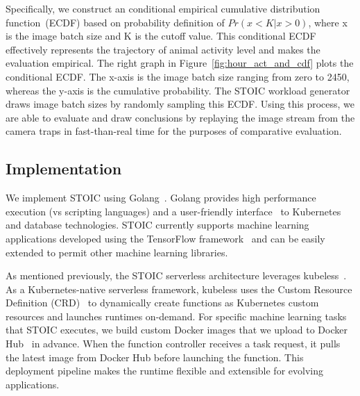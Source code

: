Specifically, we construct an
conditional empirical cumulative distribution function~(ECDF) based on
probability definition of  $Pr(x < K | x > 0)$, where x is the image batch
size and K is the cutoff value. This conditional ECDF effectively represents
the trajectory of animal activity level and makes the evaluation empirical.
The right graph in Figure~\ref{fig:hour_act_and_cdf} plots the conditional ECDF. 
The x-axis is the image
batch size ranging from zero to 2450, whereas the y-axis is the cumulative
probability. The STOIC workload generator draws image batch sizes by
randomly sampling this ECDF.
Using this process,
we are able to evaluate and draw conclusions by replaying the image stream
from the camera traps in fast-than-real time for the purposes of comparative
evaluation.




 \subsection{Implementation}

We implement STOIC using
Golang~\cite{ref:golang}. Golang provides high performance execution (vs
scripting languages) and a user-friendly interface~\cite{ref:client-go} to
Kubernetes and database technologies. STOIC currently supports machine learning
applications developed using the TensorFlow framework~\cite{ref:tensorflow}
and can be easily extended to permit other machine learning libraries.
 
As mentioned previously, 
the STOIC serverless architecture leverages kubeless~\cite{ref:kubeless}.
As a Kubernetes-native
serverless framework, kubeless uses the Custom Resource Definition
(CRD)~\cite{ref:crd} to dynamically create functions as Kubernetes custom
resources and launches runtimes on-demand. For specific machine learning tasks
that STOIC executes, we build custom Docker images that we
upload to Docker Hub~\cite{ref:dockerhub} in advance. When the function
controller receives a task request, it pulls the latest
image from Docker Hub before launching the function. This deployment pipeline
makes the runtime flexible and extensible for evolving applications. 

